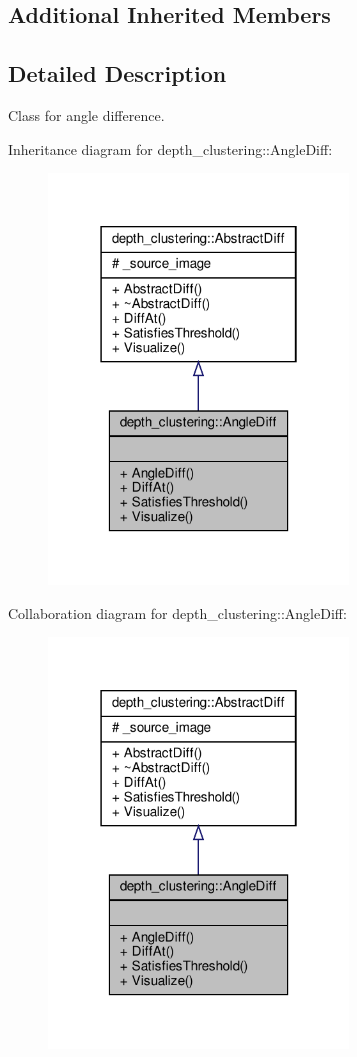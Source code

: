 \subsection*{Additional Inherited Members}


\subsection{Detailed Description}
Class for angle difference. 

Inheritance diagram for depth\+\_\+clustering\+:\+:Angle\+Diff\+:\nopagebreak
\begin{figure}[H]
\begin{center}
\leavevmode
\includegraphics[width=226pt]{classdepth__clustering_1_1AngleDiff__inherit__graph}
\end{center}
\end{figure}


Collaboration diagram for depth\+\_\+clustering\+:\+:Angle\+Diff\+:\nopagebreak
\begin{figure}[H]
\begin{center}
\leavevmode
\includegraphics[width=226pt]{classdepth__clustering_1_1AngleDiff__coll__graph}
\end{center}
\end{figure}


